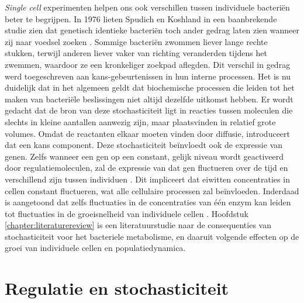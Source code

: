 \textit{Single cell} experimenten helpen ons ook verschillen tussen individuele bacteriën beter te begrijpen.
%
In 1976 lieten Spudich en Koshland in een baanbrekende studie zien dat genetisch identieke bacteriën toch ander gedrag laten zien wanneer zij naar voedsel zoeken \cite{Spudich1976}.
%
Sommige bacteriën zwommen liever lange rechte stukken, terwijl anderen liever vaker van richting veranderden tijdens het zwemmen, waardoor ze een kronkeliger zoekpad aflegden.
%
Dit verschil in gedrag werd toegeschreven aan kans-gebeurtenissen in hun interne processen.
%
Het is nu duidelijk dat in het algemeen geldt dat biochemische processen die leiden tot het maken van bacteriële beslissingen niet altijd dezelfde uitkomst hebben. 
%
Er wordt gedacht dat de bron van deze stochasticiteit ligt in reacties tussen moleculen die slechts in kleine aantallen aanwezig zijn, maar plaatsvinden in relatief grote volumes.
%
Omdat de reactanten elkaar moeten vinden door diffusie, introduceert dat een kans component.
%
Deze stochasticiteit beïnvloedt ook de expressie van genen.  
%
Zelfs wanneer een gen op een constant, gelijk niveau wordt geactiveerd door regulatiemoleculen, zal de expressie van dat gen fluctueren over de tijd en verschillend zijn tussen individuen \cite{Elowitz2002}. 
%
Dit impliceert dat eiwitten concentraties in cellen constant fluctueren, wat alle cellulaire processen zal beïnvloeden.
%
Inderdaad is aangetoond dat zelfs fluctuaties in de concentraties van één enzym kan leiden tot fluctuaties in de groeisnelheid van individuele cellen \cite{Kiviet2014}.
%
Hoofdstuk \ref{chapter:literaturereview} is een literatuurstudie naar de consequenties van stochasticiteit voor het bacteriele metabolisme, en daaruit volgende effecten op de groei van individuele cellen en populatiedynamica.

\section{Regulatie en stochasticiteit}

